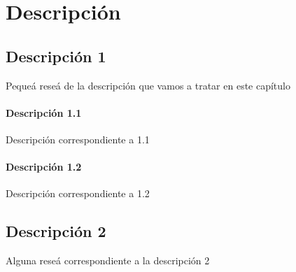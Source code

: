 \chapter{Descripción}

\section{Descripción 1}
Pequeá reseá de la descripción que vamos a tratar en este capítulo
\subsubsection{Descripción 1.1}	
Descripción correspondiente a 1.1
\subsubsection{Descripción 1.2}	
Descripción correspondiente a 1.2

\section{Descripción 2}
Alguna reseá correspondiente a la descripción 2





